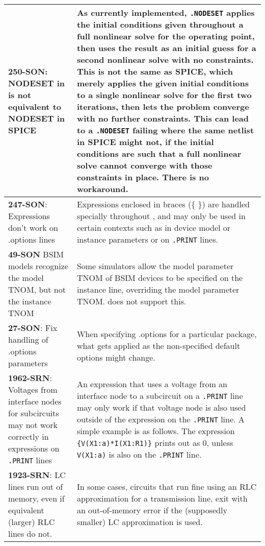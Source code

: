 {\begin{longtable}[h] {>{\raggedright\small}m{2in}|>{\raggedright\let\\\tabularnewline\small}m{3.5in}}
\textbf{250-SON}: NODESET in \Xyce{} is not equivalent to NODESET in SPICE & As
currently implemented, \texttt{.NODESET} applies the initial
conditions given throughout a full nonlinear solve for the operating
point, then uses the result as an initial guess for a second nonlinear
solve with no constraints.  This is not the same as SPICE, which
merely applies the given initial conditions to a single nonlinear
solve for the first two iterations, then lets the problem converge
with no further constraints.  This can lead to
a \Xyce{} \texttt{.NODESET} failing where the same netlist in SPICE
might not, if the initial conditions are such that a full nonlinear
solve cannot converge with those constraints in place.  There is no
workaround.
\\ \hline

\textbf{247-SON}: Expressions don't work on .options lines & Expressions
enclosed in braces (\{ \}) are handled specially throughout \Xyce{},
and may only be used in certain contexts such as in device model or
instance parameters or on \texttt{.PRINT} lines.
\\ \hline


\textbf{49-SON} \Xyce{} BSIM models recognize the model TNOM, but not the
instance TNOM & Some simulators allow the model parameter TNOM of BSIM
devices to be specified on the instance line, overriding the model
parameter TNOM.  \Xyce{} does not support this.
\\ \hline


\textbf{27-SON}: Fix handling of .options parameters & When specifying .options
for a particular package, what gets applied as the non-specified
default options might change.  \\ \hline

\textbf{1962-SRN}: Voltages from interface nodes for subcircuits may not work
correctly in expressions on \texttt{.PRINT} lines & An expression that
uses a voltage from an interface node to a subcircuit on
a \texttt{.PRINT} line may only work if that voltage node is also used
outside of the expression on the \texttt{.PRINT} line.  A simple
example is as follows.  The expression
\texttt{\{V(X1:a)*I(X1:R1)\}} prints out as 0, unless \texttt{V(X1:a)} is also
on the \texttt{.PRINT} line.
\\ \hline

\textbf{1923-SRN}: LC lines run out of memory, even if equivalent (larger) RLC
lines do not. & In some cases, circuits that run fine using an RLC
approximation for a transmission line, exit with an out-of-memory
error if the (supposedly smaller) LC approximation is used.
\\ \hline


\end{longtable}}
